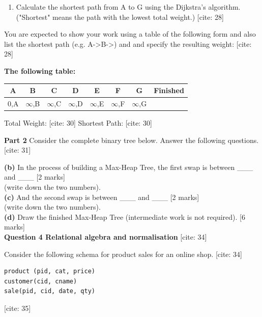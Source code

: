 \begin{enumerate}
    \item[(a)] Calculate the shortest path from A to G using the Dijkstra's algorithm. ("Shortest" means the path with the lowest total weight.) [cite: 28]
\end{enumerate}
You are expected to show your work using a table of the following form and also list the shortest path (e.g. A-\textgreater B-\textgreater) and and specify the resulting weight: [cite: 28]

\textbf{The following table:} 
\begin{tabular}{|c|c|c|c|c|c|c|c|}
\hline
A & B & C & D & E & F & G & Finished \\
\hline
0,A & $\infty$,B & $\infty$,C & $\infty$,D & $\infty$,E & $\infty$,F & $\infty$,G & \\
\hline
\end{tabular}

Total Weight: [cite: 30]
Shortest Path: [cite: 30]

\textbf{Part 2} Consider the complete binary tree below. Answer the following questions. [cite: 31]


\textbf{(b)} In the process of building a Max-Heap Tree, the first swap is between \_\_\_ and \_\_\_ [2 marks] \\
 (write down the two numbers). \\
\textbf{(c)} And the second swap is between \_\_\_ and \_\_\_ [2 marks] \\
 (write down the two numbers). \\
\textbf{(d)} Draw the finished Max-Heap Tree (intermediate work is not required). [6 marks] \\

\textbf{Question 4 Relational algebra and normalisation} [cite: 34]

Consider the following schema for product sales for an online shop. [cite: 34]
\begin{verbatim}
product (pid, cat, price)
customer(cid, cname)
sale(pid, cid, date, qty)
\end{verbatim} [cite: 35]

